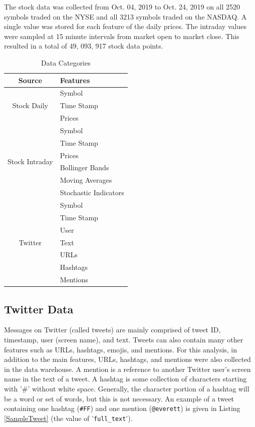 \documentclass[journal]{IEEEtran}
\begin{document}
The stock data was collected from Oct. 04, 2019 to Oct. 24, 2019 on
 all 2520 symbols traded on the NYSE and all 3213 symbols traded on the NASDAQ.
A single value was stored for each feature of the daily prices.
The intraday values were sampled at 15 minute intervals from market open
 to market close.
This resulted in a total of 49, 093, 917 stock data points.

\begin{table}
	\renewcommand{\arraystretch}{1.3}
	\caption{Data Categories}
	\label{DataCategories}
	\centering
	\begin{tabular}{c l}
		\hline
		\hline
		\textbf{Source}       & \textbf{Features}\\
		\hline
		\multirow{3}{*}{Stock Daily} &  Symbol \\
		&  Time Stamp \\
		&  Prices \\
		\hline
		\multirow{6}{*}{Stock Intraday} &  Symbol \\
		&  Time Stamp \\
		&  Prices \\
		&  Bollinger Bands \\
		&  Moving Averages \\
		&  Stochastic Indicators \\
		\hline
		\multirow{7}{*}{Twitter} &  Symbol \\
		&  Time Stamp \\
		&  User \\
		&  Text \\
		&  URLs \\
		&  Hashtags \\
		&  Mentions \\
		\hline
		\hline
	\end{tabular}
\end{table}


\subsection{Twitter Data}

Messages on Twitter (called tweets) are mainly comprised of
 tweet ID, timestamp, user (screen name), and text.
Tweets can also contain many other features such as
 URLs, hashtags, emojis,  and mentions.
For this analysis, in addition to the main features,
 URLs, hashtags, and mentions were also collected in the data warehouse.
A mention is a reference to another Twitter user's screen name
 in the text of a tweet.
A hashtag is some collection of characters starting with
 '\#' without white space.
Generally, the character portion of a hashtag will be a word or set of words,
 but this is not necessary.
An example of a tweet containing one hashtag (\texttt{\#FF}) and one 
mention (\texttt{@everett}) is given in Listing \ref{SampleTweet} (the value of
 '\texttt{full\_text}').
\end{document}
